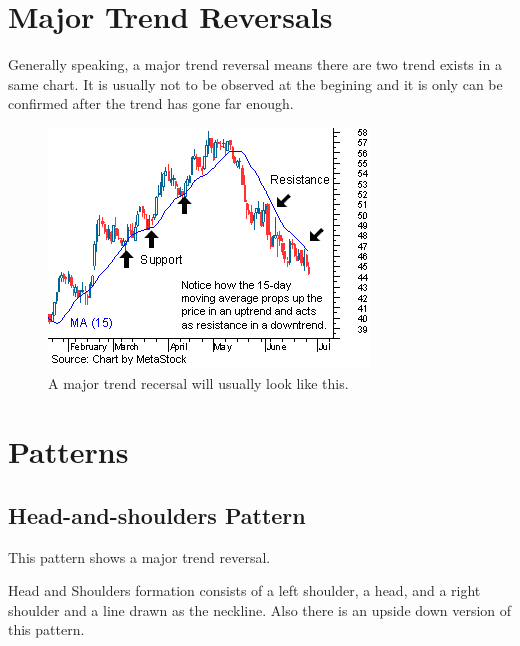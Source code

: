 \documentclass[conference]{IEEEtran}
\begin{document}
\section*{Major Trend Reversals}
Generally speaking, a major trend reversal means there are two trend exists in a same
chart. It is usually not to be observed at the begining and it is only can be confirmed
after the trend has gone far enough.

\begin{figure}[H]
    \centerline{\includegraphics[scale=0.7]{Pic/pic2.png}}
    \caption{A major trend recersal will usually look like this.}
\end{figure}

\section*{Patterns}

\subsection*{Head-and-shoulders Pattern}
This pattern shows a major trend reversal.

Head and Shoulders formation consists of a left shoulder, 
a head, and a right shoulder and a line drawn as the neckline.
Also there is an upside down version of this pattern.
\end{document}
